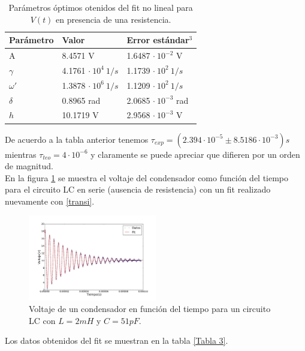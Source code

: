 \documentclass[prb,aps,twocolumn,preprintnumbers,amsmath,amssymb]{revtex4}
\begin{document}
\begin{table}[h!]
	\caption{\label{Tabla 2}Parámetros óptimos otenidos del fit no lineal para $V(t)$ en presencia de una resistencia.}
	\begin{ruledtabular}
		\begin{tabular}{||M{2.5cm}|M{2.5cm}|M{2.5cm}||}
			Parámetro & Valor & Error estándar$^3$\\
			\hline
			A & 8.4571 V & 1.6487 $\cdot\ 10^{-2}$ V\\
			$\gamma$ & 4.1761 $\cdot\ 10^{4}\ 1/s$ & 1.1739 $\cdot\ 10^{2}\ 1/s$\\
			$\omega '$ & 1.3878 $\cdot\ 10^{6}\ 1/s$ &  1.1209 $\cdot\ 10^{2}\ 1/s$\\
			$\delta$ & 0.8965 rad & 2.0685 $\cdot\ 10^{-3}$ rad\\
			$h$ & 10.1719 V & 2.9568 $\cdot\ 10^{-3}$ V\\
		\end{tabular}
	\end{ruledtabular}
\end{table}

De acuerdo a la tabla anterior tenemos $\tau_{exp} = (2.394 \cdot 10^{-5} \pm 8.5186 \cdot 10^{-3})s$ mientras $\tau_{teo} = 4 \cdot 10^{-6}$ y claramente se puede apreciar que difieren por un orden de magnitud.\\

En la figura \ref{fig: amorti2} se muestra el voltaje del condensador como función del tiempo para el circuito LC en serie (ausencia de resistencia) con un fit realizado nuevamente con \eqref{transi}.\\

\begin{figure}[h!]
	\centering
	\includegraphics[width=0.5\textwidth,height=0.25\textheight]{amorti2}
	\caption{Voltaje de un condensador en función del tiempo para un circuito LC con  $L = 2 mH$ y $C = 51 pF$.}
	\label{fig: amorti2}
\end{figure}

Los datos obtenidos del fit se muestran en la tabla \ref{Tabla 3}.\\
\end{document}
